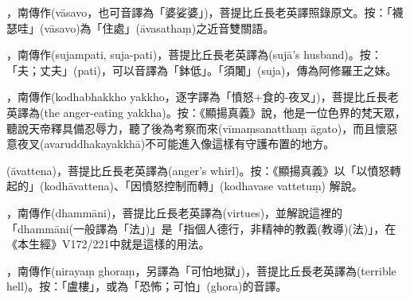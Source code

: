 \startitemgroup[noteitems]
\item{}，南傳作(vāsavo，也可音譯為「婆娑婆」)，菩提比丘長老英譯照錄原文。按：「襪瑟哇」(vāsavo)為「住處」(āvasathaṃ)之近音雙關語。
\stopitemgroup

\startitemgroup[noteitems]
\item{}，南傳作(sujampati, suja-pati)，菩提比丘長老英譯為(sujā's husband)。按：「夫；丈夫」(pati)，可以音譯為「鉢低」。「須闍」(suja)，傳為阿修羅王之妹。
\stopitemgroup

\startitemgroup[noteitems]
\item{}，南傳作(kodhabhakkho yakkho，逐字譯為「憤怒+食的-夜叉」)，菩提比丘長老英譯為(the anger-eating yakkha)。按：《顯揚真義》說，他是一位色界的梵天眾，聽說天帝釋具備忍辱力，聽了後為考察而來(vīmaṃsanatthaṃ āgato)，而且懷惡意夜叉(avaruddhakayakkhā)不可能進入像這樣有守護布置的地方。
\stopitemgroup

\startitemgroup[noteitems]
\item{}(āvattena)，菩提比丘長老英譯為(anger's whirl)。按：《顯揚真義》以「以憤怒轉起的」(kodhāvattena)、「因憤怒控制而轉」(kodhavase vattetuṃ) 解說。
\stopitemgroup

\startitemgroup[noteitems]
\item{}，南傳作(dhammāni)，菩提比丘長老英譯為(virtues)，並解說這裡的「dhammāni(一般譯為「法」)」是「指個人德行，非精神的教義(教導)(法)」，在《本生經》V172/221中就是這樣的用法。
\stopitemgroup

\startitemgroup[noteitems]
\item{}，南傳作(nirayaṃ ghoraṃ，另譯為「可怕地獄」)，菩提比丘長老英譯為(terrible hell)。按：「盧樓」，或為「恐怖；可怕」(ghora)的音譯。
\stopitemgroup

